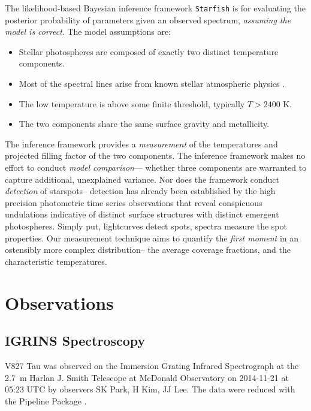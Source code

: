 \documentclass[twocolumn]{emulateapj}%
\begin{document}
The likelihood-based Bayesian inference framework \texttt{Starfish} is for evaluating the posterior probability of parameters given an observed spectrum, \emph{assuming the model is correct}.  The model assumptions are:

\begin{itemize}
  \item Stellar photospheres are composed of exactly two distinct temperature components.
  \item Most of the spectral lines arise from known stellar atmospheric physics \citep{husser13}.
  \item The low temperature is above some finite threshold, typically $T>2400$ K.
  \item The two components share the same surface gravity and metallicity.
\end{itemize}

The inference framework provides a \emph{measurement} of the temperatures and projected filling factor of the two components.  The inference framework makes no effort to conduct \emph{model comparison}--- whether three components are warranted to capture additional, unexplained variance.  Nor does the framework conduct \emph{detection} of starspots-- detection has already been established by the high precision photometric time series observations that reveal conspicuous undulations indicative of distinct surface structures with distinct emergent photospheres.  Simply put, lightcurves detect spots, spectra measure the spot properties.  Our measurement technique aims to quantify the \emph{first moment} in an ostensibly more complex distribution-- the average coverage fractions, and the characteristic temperatures.



\section{Observations}\label{sec:obs}

\subsection{IGRINS Spectroscopy}\label{sec:igrins}

V827 Tau was observed on the Immersion Grating Infrared Spectrograph \citep[IGRINS]{park14} at the 2.7~m Harlan J. Smith Telescope at McDonald Observatory on 2014-11-21 at 05:23 UTC by observers SK Park, H Kim, JJ Lee.  The data were reduced with the Pipeline Package \citep{jaejoonlee15}.
\end{document}
